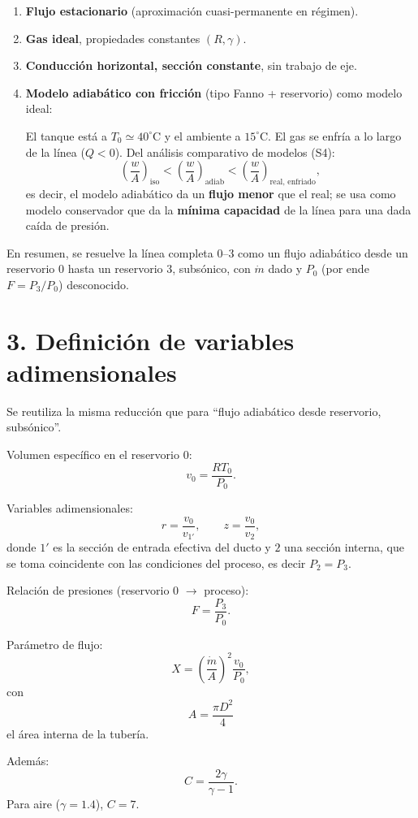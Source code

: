 \documentclass[11pt,a4paper]{article}
\begin{document}
\begin{enumerate}
  \item \textbf{Flujo estacionario} (aproximación cuasi-permanente en régimen).
  \item \textbf{Gas ideal}, propiedades constantes $(R,\gamma)$.
  \item \textbf{Conducción horizontal, sección constante}, sin trabajo de eje.
  \item \textbf{Modelo adiabático con fricción} (tipo Fanno + reservorio) como modelo ideal:

  El tanque está a $T_0\simeq 40^\circ\text{C}$ y el ambiente a $15^\circ\text{C}$.
  El gas se enfría a lo largo de la línea ($Q<0$).
  Del análisis comparativo de modelos (S4):
  \[
  \left(\frac{w}{A}\right)_{\text{iso}}
  < \left(\frac{w}{A}\right)_{\text{adiab}}
  < \left(\frac{w}{A}\right)_{\text{real, enfriado}},
  \]
  es decir, el modelo adiabático da un \textbf{flujo menor} que el real; se usa como
  modelo conservador que da la \textbf{mínima capacidad} de la línea para una
  dada caída de presión.
\end{enumerate}

En resumen, se resuelve la línea completa 0--3 como un flujo adiabático desde un reservorio 0 hasta un reservorio 3, subsónico, con $\dot m$ dado y $P_0$ (por ende $F=P_3/P_0$) desconocido.

\section*{3. Definición de variables adimensionales}

Se reutiliza la misma reducción que para ``flujo adiabático desde reservorio, subsónico''.

Volumen específico en el reservorio 0:
\[
v_0 = \frac{R T_0}{P_0}.
\]

Variables adimensionales:
\[
r = \frac{v_0}{v_{1'}},\qquad
z = \frac{v_0}{v_2},
\]
donde $1'$ es la sección de entrada efectiva del ducto y $2$ una sección
interna, que se toma coincidente con las condiciones del proceso, es decir
$P_2 = P_3$.

Relación de presiones (reservorio 0 $\to$ proceso):
\[
F = \frac{P_3}{P_0}.
\]

Parámetro de flujo:
\[
X = \left(\frac{\dot m}{A}\right)^2 \frac{v_0}{P_0},
\]
con
\[
A = \frac{\pi D^2}{4}
\]
el área interna de la tubería.

Además:
\[
C = \frac{2\gamma}{\gamma-1}.
\]
Para aire ($\gamma=1.4$), $C=7$.
\end{document}
